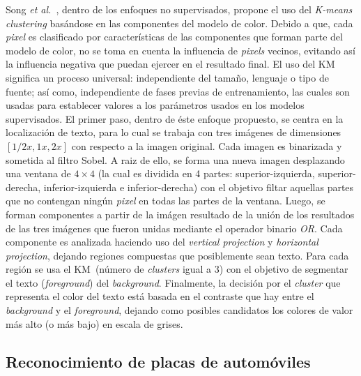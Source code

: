 Song \textit{et al.}~\cite{Song:2008:ITEbasedKMC}, dentro de los enfoques no
supervisados, propone el uso del \textit{K-means clustering} basándose en las
componentes del modelo de color. Debido a que, cada \textit{pixel} es
clasificado por características de las componentes que forman parte del modelo
de color, no se toma en cuenta la influencia de \textit{pixels} vecinos,
evitando así la influencia negativa que puedan ejercer en el resultado final. El
uso del KM significa un proceso universal: independiente del tamaño, lenguaje o
tipo de fuente; así como, independiente de fases previas de entrenamiento, las
cuales son usadas para establecer valores a los parámetros usados en los modelos
supervisados. El primer paso, dentro de éste enfoque propuesto, se centra en la
localización de texto, para lo cual se trabaja con tres imágenes de dimensiones
$[1/2 x, 1x, 2x]$ con respecto a la imagen original. Cada imagen es binarizada y
sometida al filtro Sobel. A raiz de ello, se forma una nueva imagen desplazando
una ventana de $4 \times 4$ (la cual es dividida en 4 partes:
superior-izquierda, superior-derecha, inferior-izquierda e inferior-derecha) con
el objetivo filtar aquellas partes que no contengan ningún \textit{pixel} en
todas las partes de la ventana. Luego, se forman componentes a partir de la
imágen resultado de la unión de los resultados de las tres imágenes que fueron
unidas mediante el operador binario \textit{OR}. Cada componente es analizada
haciendo uso del \textit{vertical projection} y \textit{horizontal projection},
dejando regiones compuestas que posiblemente sean texto. Para cada región se usa
el KM~(número de \textit{clusters} igual a $3$) con el objetivo de segmentar el
texto (\textit{foreground}) del \textit{background}. Finalmente, la decisión por
el \textit{cluster} que representa el color del texto está basada en el
contraste que hay entre el \textit{background} y el \textit{foreground}, dejando
como posibles candidatos los colores de valor más alto (o más bajo) en escala de
grises.

\subsection{Reconocimiento de placas de automóviles}

